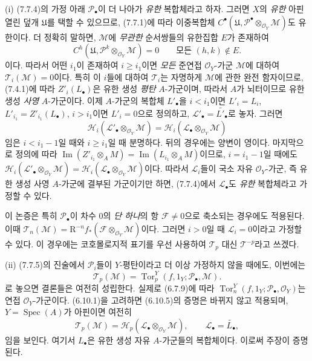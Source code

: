 \begin{remarks}[7.7.12]
\textnormal{(i)} (7.7.4)의 가정 아래 $\mathscr P_\bullet$이 더 나아가
\emph{유한} 복합체라고 하자. 그러면 $X$의 \emph{유한} 아핀 열린 덮개
$\mathfrak U$를 택할 수 있으므로, (7.7.1)에 따라 이중복합체
$C^\bullet(\mathfrak U,
\mathscr P^\bullet\otimes_{\mathscr O_Y}\mathscr M)$도 유한이다. 더
정확히 말하면, $\mathscr M$에 \emph{무관한} 순서쌍들의 유한집합 $E$가
존재하여
\[
  C^h(\mathfrak U,\mathscr P^k\otimes_{\mathscr O_Y}\mathscr M)=0
  \qquad\text{모든 }(h,k)\notin E.
\]
이다. 따라서 어떤 $i_1$이 존재하여 $i\geq i_1$이면 \emph{모든}
준연접 $\mathscr O_Y$-가군 $\mathscr M$에 대하여
$\mathscr T_i(\mathscr M)=0$이다. 특히 이 $i$들에 대하여
$\mathscr T_i$는 자명하게 $\mathscr M$에 관한 완전 함자이므로,
(7.4.1)에 따라 $Z'_i(L_\bullet)$은 유한 생성 \emph{평탄}
$A$-가군이며, 따라서 $A$가 뇌터이므로 유한 생성 \emph{사영}
$A$-가군이다. 이제 $A$-가군의 복합체 $L'_\bullet$을
$i<i_1$이면 $L'_i=L_i$, $L'_{i_1}=Z'_{i_1}(L_\bullet)$,
$i>i_1$이면 $L'_i=0$으로 정의하고,
$\mathscr L'_\bullet=\widetilde{L'_\bullet}$로 놓자. 그러면
\[
  \mathscr H_i(\mathscr L'_\bullet\otimes_{\mathscr O_Y}\mathscr M)
  =
  \mathscr H_i(\mathscr L_\bullet\otimes_{\mathscr O_Y}\mathscr M)
\]
임은 $i<i_1-1$일 때와 $i\geq i_1$일 때 분명하다. 뒤의 경우에는 양변이
영이다. 마지막으로 정의에 따라
$\operatorname{Im}(Z'_{i_1}\otimes_A M)
=\operatorname{Im}(L_{i_1}\otimes_A M)$이므로, $i=i_1-1$일 때에도
$\mathscr H_i(\mathscr L'_\bullet\otimes_{\mathscr O_Y}\mathscr M)
=\mathscr H_i(\mathscr L_\bullet\otimes_{\mathscr O_Y}\mathscr M)$이다.
따라서 $\mathscr L_i$들이 국소 자유 $\mathscr O_Y$-가군, 즉 유한
생성 사영 $A$-가군에 결부된 가군이기만 하면, (7.7.4)에서
$\mathscr L_\bullet$도 \emph{유한} 복합체라고 가정할 수 있다.

이 논증은 특히 $\mathscr P_\bullet$이 차수 $0$의 \emph{단 하나}의 항
$\mathscr F\ne0$으로 축소되는 경우에도 적용된다. 이때
$\mathscr T_n(\mathscr M)=\mathrm R^{-n}f_*
(\mathscr F\otimes_{\mathscr O_Y}\mathscr M)$이다. 그러면 $i>0$일 때
$\mathscr L_i=0$이라고 가정할 수 있다. 이 경우에는 코호몰로지적 표기를
우선 사용하여 $\mathscr T_p$ 대신 $\mathscr T^{-p}$라고 쓰겠다.

\medskip
\textnormal{(ii)} (7.7.5)의 진술에서 $\mathscr P_i$들이 $Y$-평탄이라고
더 이상 가정하지 않을 때에도, 이번에는
\[
  \mathscr T_p(\mathscr M)
  =
  \operatorname{Tor}^Y_p
    (f,1_Y;\mathscr P_\bullet,\mathscr M).
  \tag{7.7.12.1}\label{III.7.7.12.1.fr}
\]
로 놓으면 결론들은 여전히 성립한다. 실제로 (6.7.9)에 따라
$\operatorname{Tor}^Y_n(f,1_Y;\mathscr P_\bullet,\mathscr O_Y)$는 연접
$\mathscr O_Y$-가군이다. (6.10.1)을 고려하면 (6.10.5)의 증명은 바뀌지
않고 적용되며, $Y=\operatorname{Spec}(A)$가 아핀이면 여전히
\[
  \mathscr T_p(\mathscr M)
  =
  \mathscr H_p(\mathscr L_\bullet\otimes_{\mathscr O_Y}\mathscr M),
  \qquad
  \mathscr L_\bullet=\widetilde{L_\bullet},
\]
임을 보인다. 여기서 $L_\bullet$은 유한 생성 자유 $A$-가군들의
복합체이다. 이로써 주장이 증명된다.
\end{remarks}


